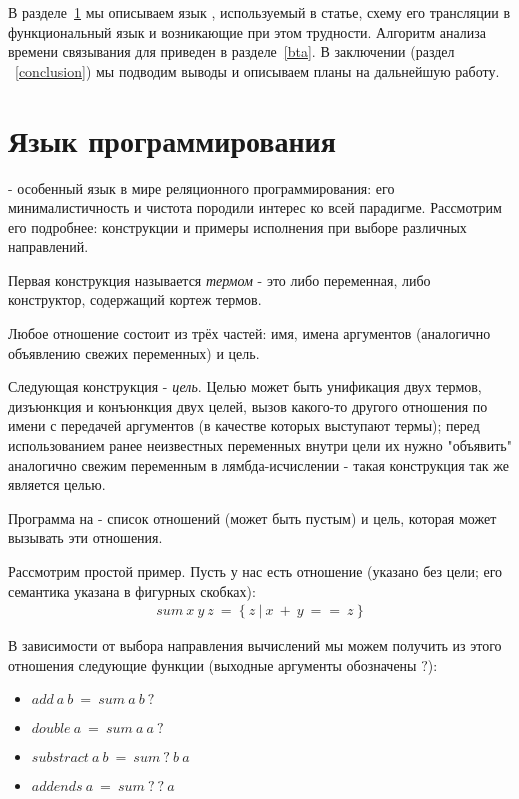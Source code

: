 \documentclass[conference]{IEEEtran}
\begin{document}
В разделе~\ref{miniKanren} мы описываем язык \miniKanren{}, используемый в статье, схему его трансляции в функциональный язык и возникающие при этом трудности. 
Алгоритм анализа времени связывания для \miniKanren{} приведен в разделе~\ref{bta}. 
В заключении (раздел ~\ref{conclusion}) мы подводим выводы и описываем планы на дальнейшую работу. 

\section{Язык программирования \miniKanren{}}\label{miniKanren}

\miniKanren - особенный язык в мире реляционного программирования: его минималистичность и чистота породили интерес ко всей парадигме. Рассмотрим его подробнее: конструкции и примеры исполнения при выборе различных направлений.

Первая конструкция называется \emph{термом} - это либо переменная, либо конструктор, содержащий кортеж термов.

Любое отношение состоит из трёх частей: имя, имена аргументов (аналогично объявлению свежих переменных) и цель.

Следующая конструкция - \emph{цель}. Целью может быть унификация двух термов, дизъюнкция и конъюнкция двух целей, вызов какого-то другого отношения по имени с передачей аргументов (в качестве которых выступают термы); перед использованием ранее неизвестных переменных внутри цели их нужно "объявить" аналогично свежим переменным в лямбда-исчислении - такая конструкция так же является целью.

Программа на \miniKanren - список отношений (может быть пустым) и цель, которая может вызывать эти отношения.

Рассмотрим простой пример. Пусть у нас есть отношение (указано без цели; его семантика указана в фигурных скобках):
$$\begin{aligned}sum~x~y~z~=~\{~z~|~x~+~y~==~z~\}\end{aligned}$$

В зависимости от выбора направления вычислений мы можем получить из этого отношения следующие функции (выходные аргументы обозначены $?$):
\begin{itemize}
    \item $add~a~b~=~sum~a~b~?$
    \item $double~a~=~sum~a~a~?$
    \item $substract~a~b~=~sum~?~b~a$
    \item $addends~a~=~sum~?~?~a$
\end{itemize}
\end{document}
